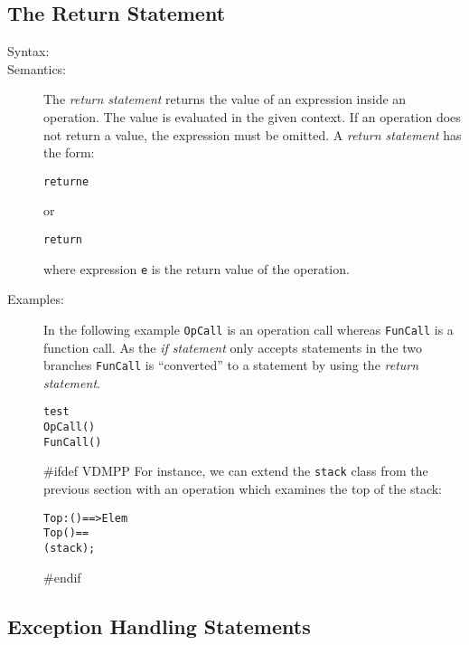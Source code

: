 \documentclass[\pformat,12pt]{article}
\begin{document}
\subsection{The Return Statement}

\begin{description}
\item[Syntax:]


\item[Semantics:] The {\it return statement} returns the value of an
  expression inside an operation. The value is evaluated in the given
  context. If an operation does not return a value, the expression must be
  omitted. A {\it return statement\/} has the form:
  \begin{alltt}
    return e
  \end{alltt}
  or
  \begin{alltt}
    return
  \end{alltt}
  where expression {\tt e} is the return value of the operation.

\item[Examples:] In the following example {\tt OpCall} is an operation call
  whereas {\tt FunCall} is a function call. As the {\it if statement\/}
  only accepts statements in the two branches {\tt FunCall} is
  ``converted'' to a statement by using the {\it return statement}.
  \begin{alltt}
     test
     OpCall()
      FunCall()
  \end{alltt}
#ifdef VDMPP
  For instance, we can extend the \texttt{stack} class from the
  previous section with an operation which examines the top of the
  stack:
\begin{alltt}
  \PUBLIC Top : () ==> Elem
  Top() ==
     ( stack);
\end{alltt}
#endif

\end{description}

\subsection{Exception Handling Statements}
\end{document}
